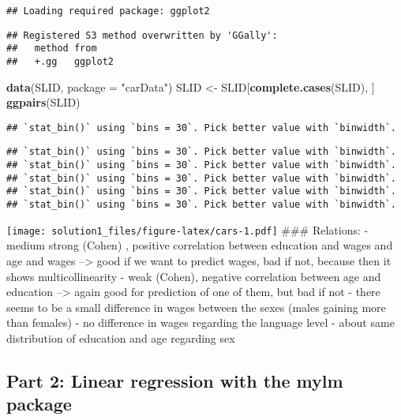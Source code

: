\documentclass[
]{article}
\newenvironment{Shaded}{\begin{snugshade}}{\end{snugshade}}
\newcommand{\AttributeTok}[1]{\textcolor[rgb]{0.13,0.29,0.53}{#1}}
\newcommand{\FunctionTok}[1]{\textcolor[rgb]{0.13,0.29,0.53}{\textbf{#1}}}
\newcommand{\NormalTok}[1]{#1}
\newcommand{\OtherTok}[1]{\textcolor[rgb]{0.56,0.35,0.01}{#1}}
\newcommand{\StringTok}[1]{\textcolor[rgb]{0.31,0.60,0.02}{#1}}
\begin{document}
\begin{verbatim}
## Loading required package: ggplot2
\end{verbatim}

\begin{verbatim}
## Registered S3 method overwritten by 'GGally':
##   method from   
##   +.gg   ggplot2
\end{verbatim}

\begin{Shaded}
\begin{Highlighting}[]
\FunctionTok{data}\NormalTok{(SLID, }\AttributeTok{package =} \StringTok{"carData"}\NormalTok{)}
\NormalTok{SLID }\OtherTok{\textless{}{-}}\NormalTok{ SLID[}\FunctionTok{complete.cases}\NormalTok{(SLID), ]}
\FunctionTok{ggpairs}\NormalTok{(SLID)}
\end{Highlighting}
\end{Shaded}

\begin{verbatim}
## `stat_bin()` using `bins = 30`. Pick better value with `binwidth`.
\end{verbatim}

\begin{verbatim}
## `stat_bin()` using `bins = 30`. Pick better value with `binwidth`.
## `stat_bin()` using `bins = 30`. Pick better value with `binwidth`.
## `stat_bin()` using `bins = 30`. Pick better value with `binwidth`.
## `stat_bin()` using `bins = 30`. Pick better value with `binwidth`.
## `stat_bin()` using `bins = 30`. Pick better value with `binwidth`.
\end{verbatim}

\texttt{[image: solution1\_files/figure-latex/cars-1.pdf]} \#\#\#
Relations: - medium strong (Cohen) , positive correlation between
education and wages and age and wages --\textgreater{} good if we want
to predict wages, bad if not, because then it shows multicollinearity -
weak (Cohen), negative correlation between age and education
--\textgreater{} again good for prediction of one of them, but bad if
not - there seems to be a small difference in wages between the sexes
(males gaining more than females) - no difference in wages regarding the
language level - about same distribution of education and age regarding
sex

\hypertarget{part-2-linear-regression-with-the-mylm-package}{%
\subsection{Part 2: Linear regression with the mylm
package}\label{part-2-linear-regression-with-the-mylm-package}}
\end{document}
